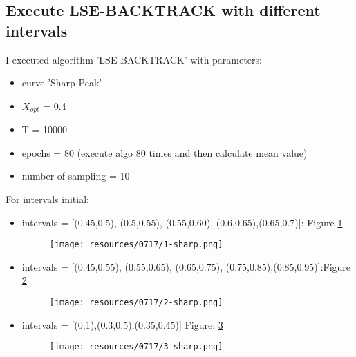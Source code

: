 \subsection*{Execute LSE-BACKTRACK with different intervals}
I executed algorithm 'LSE-BACKTRACK' with parameters:
\begin{itemize}
	\item curve 'Sharp Peak'
	\item $X_{opt}$ = 0.4
	\item T = 10000
	\item epochs = 80 (execute algo 80 times and then calculate mean value)
	\item number of sampling = 10	
\end{itemize}

For intervals initial:
\begin{itemize}
	\item intervals = [(0.45,0.5), (0.5,0.55), (0.55,0.60), (0.6,0.65),(0.65,0.7)]: Figure \ref{interval1}
	
	\begin{figure}[h]
		\centering
		\texttt{[image: resources/0717/1-sharp.png]}
		\label{interval1}
	\end{figure}	
	
	\item intervals = [(0.45,0.55), (0.55,0.65), (0.65,0.75), (0.75,0.85),(0.85,0.95)]:Figure \ref{interval2}
		
	\begin{figure}[h]
		\centering
		\texttt{[image: resources/0717/2-sharp.png]}
		\label{interval2}
	\end{figure}	
	
	\item intervals = [(0,1),(0.3,0.5),(0.35,0.45)]	Figure: \ref{interval3}
	
	\begin{figure}[h]
		\centering
		\texttt{[image: resources/0717/3-sharp.png]}
		\label{interval3}
	\end{figure}	
\end{itemize}

